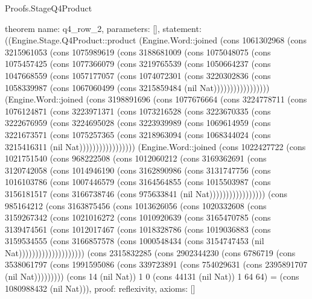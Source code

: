 \begin{lexlean}{Proofs.StageQ4Product}
\begin{semanticmodule}
theorem{
  name: q4_row_2,
  parameters: [],
  statement: ((Engine.Stage.Q4Product::product (Engine.Word::joined (cons 1061302968 (cons 3215961053 (cons 1075989619 (cons 3188681009 (cons 1075048075 (cons 1075457425 (cons 1077366079 (cons 3219765539 (cons 1050664237 (cons 1047668559 (cons 1057177057 (cons 1074072301 (cons 3220302836 (cons 1058339987 (cons 1067060499 (cons 3215859484 (nil Nat))))))))))))))))) (Engine.Word::joined (cons 3198891696 (cons 1077676664 (cons 3224778711 (cons 1076124871 (cons 3223971371 (cons 1073216528 (cons 3223670335 (cons 3222676959 (cons 3224695028 (cons 3223939989 (cons 1069614959 (cons 3221673571 (cons 1075257365 (cons 3218963094 (cons 1068344024 (cons 3215416311 (nil Nat))))))))))))))))) (Engine.Word::joined (cons 1022427722 (cons 1021751540 (cons 968222508 (cons 1012060212 (cons 3169362691 (cons 3120742058 (cons 1014946190 (cons 3162890986 (cons 3131747756 (cons 1016103786 (cons 1007446579 (cons 3164564855 (cons 1015503987 (cons 3156181517 (cons 3166738746 (cons 975633841 (nil Nat))))))))))))))))) (cons 985164212 (cons 3163875456 (cons 1013626056 (cons 1020332608 (cons 3159267342 (cons 1021016272 (cons 1010920639 (cons 3165470785 (cons 3139474561 (cons 1012017467 (cons 1018328786 (cons 1019036883 (cons 3159534555 (cons 3166857578 (cons 1000548434 (cons 3154747453 (nil Nat)))))))))))))))))))) (cons 2315832285 (cons 2902344230 (cons 6786719 (cons 3538061797 (cons 1991595086 (cons 339723891 (cons 754029631 (cons 2395891707 (nil Nat))))))))) (cons 14 (nil Nat)) 1 0 (cons 44131 (nil Nat)) 1 64 64) = (cons 1080988432 (nil Nat))),
  proof: reflexivity{},
  axioms: []
}
\end{semanticmodule}
\end{lexlean}
